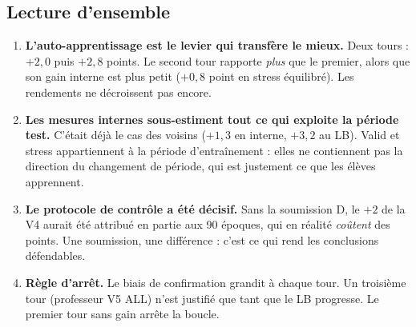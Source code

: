 \subsection{Lecture d'ensemble}
\begin{enumerate}
\item \textbf{L'auto-apprentissage est le levier qui transfère le mieux.} Deux tours : $+2{,}0$ puis $+2{,}8$ points. Le second tour rapporte \emph{plus} que le premier, alors que son gain interne est plus petit ($+0{,}8$ point en stress équilibré). Les rendements ne décroissent pas encore.
\item \textbf{Les mesures internes sous-estiment tout ce qui exploite la période test.} C'était déjà le cas des voisins ($+1{,}3$ en interne, $+3{,}2$ au LB). Valid et stress appartiennent à la période d'entraînement : elles ne contiennent pas la direction du changement de période, qui est justement ce que les élèves apprennent.
\item \textbf{Le protocole de contrôle a été décisif.} Sans la soumission D, le $+2$ de la V4 aurait été attribué en partie aux 90 époques, qui en réalité \emph{coûtent} des points. Une soumission, une différence : c'est ce qui rend les conclusions défendables.
\item \textbf{Règle d'arrêt.} Le biais de confirmation grandit à chaque tour. Un troisième tour (professeur V5 ALL) n'est justifié que tant que le LB progresse. Le premier tour sans gain arrête la boucle.
\end{enumerate}
